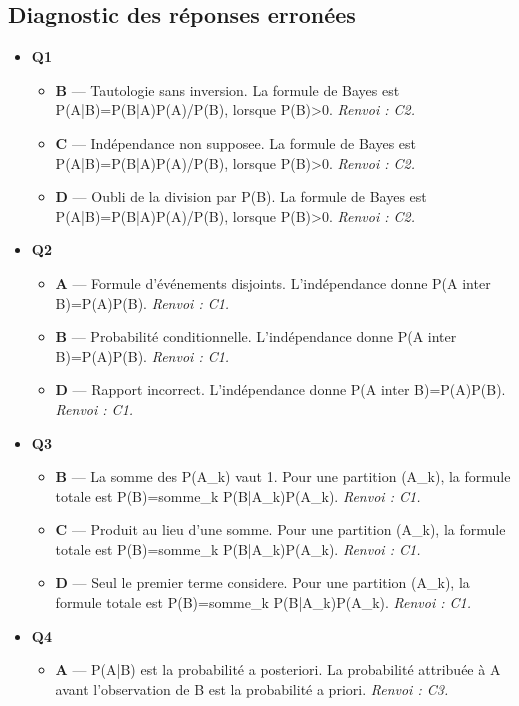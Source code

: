 \subsection*{Diagnostic des réponses erronées}

\begin{itemize}
  \item \textbf{Q1}
  \begin{itemize}
    \item \textbf{B} — Tautologie sans inversion. La formule de Bayes est P(A|B)=P(B|A)P(A)/P(B), lorsque P(B)>0. \emph{Renvoi : C2.}
    \item \textbf{C} — Indépendance non supposee. La formule de Bayes est P(A|B)=P(B|A)P(A)/P(B), lorsque P(B)>0. \emph{Renvoi : C2.}
    \item \textbf{D} — Oubli de la division par P(B). La formule de Bayes est P(A|B)=P(B|A)P(A)/P(B), lorsque P(B)>0. \emph{Renvoi : C2.}
  \end{itemize}
  \item \textbf{Q2}
  \begin{itemize}
    \item \textbf{A} — Formule d'événements disjoints. L'indépendance donne P(A inter B)=P(A)P(B). \emph{Renvoi : C1.}
    \item \textbf{B} — Probabilité conditionnelle. L'indépendance donne P(A inter B)=P(A)P(B). \emph{Renvoi : C1.}
    \item \textbf{D} — Rapport incorrect. L'indépendance donne P(A inter B)=P(A)P(B). \emph{Renvoi : C1.}
  \end{itemize}
  \item \textbf{Q3}
  \begin{itemize}
    \item \textbf{B} — La somme des P(A\_k) vaut 1. Pour une partition (A\_k), la formule totale est P(B)=somme\_k P(B|A\_k)P(A\_k). \emph{Renvoi : C1.}
    \item \textbf{C} — Produit au lieu d'une somme. Pour une partition (A\_k), la formule totale est P(B)=somme\_k P(B|A\_k)P(A\_k). \emph{Renvoi : C1.}
    \item \textbf{D} — Seul le premier terme considere. Pour une partition (A\_k), la formule totale est P(B)=somme\_k P(B|A\_k)P(A\_k). \emph{Renvoi : C1.}
  \end{itemize}
  \item \textbf{Q4}
  \begin{itemize}
    \item \textbf{A} — P(A|B) est la probabilité a posteriori. La probabilité attribuée à A avant l'observation de B est la probabilité a priori. \emph{Renvoi : C3.}

\end{itemize}
\end{itemize}
